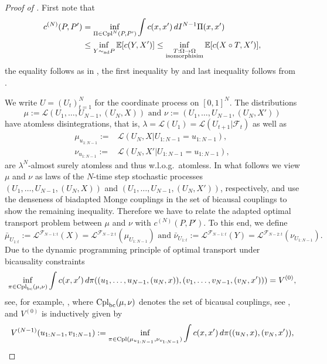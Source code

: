 \documentclass[a4paper]{amsart}
\numberwithin{theorem}{section}
\theoremstyle{definition}
\newcommand{\E}{\mathbb{E}}
\newcommand{\F}{\mathcal{F}}
\newcommand{\law}{\mathcal{L}}
\newcommand{\cpl}{\textup{Cpl}}
\newcommand{\simad}{\sim_{\mathrm{ad}}}
\begin{document}
\begin{proof}[Proof of ]
    First note that
    \begin{align*}
        c^{(N)}(P,P') &= \inf_{\Pi \in \cpl^N(P,P')} \int c(x,x') \, dI^{N-1} \Pi(x,x') \\
        &\le \inf_{Y \simad P} \E[c(Y,X')] \le \inf_{ \substack{ T : \Omega \to \Omega \\ {\rm isomorphisim} } } \E[c(X \circ T, X')],        
    \end{align*}
    the equality follows as in , the first inequality by  and last inequality follows from .
    
 
    We write $U=(U_t)_{t=1}^N$ for the coordinate process on $[0,1]^N$. The distributions
    \[
        \mu := \law(U_1,\dots,U_{N-1},(U_N,X)) \text{ and }
        \nu := (U_1,\dots,U_{N-1},(U_N,X'))
    \]
    have atomless disintegrations, that is, $\lambda = \law(U_1) = \law(U_{t + 1} | \F_t)$ as well as 
    \begin{align*}
        \mu_{u_{1:N-1}} :=& \law(U_N,X|U_{1:N-1} = u_{1:N-1}),\\
        \nu_{u_{1:N-1}} :=& \law(U_N,X'|U_{1:N-1} = u_{1:N-1}),
    \end{align*}
    are $\lambda^N$-almost surely atomless and thus w.l.o.g.\  atomless. 
    In what follows we view $\mu$ and $\nu$ as laws of the $N$-time step stochastic processes $(U_1,\dots,U_{N-1},(U_N,X))$ and $(U_1,\dots,U_{N-1},(U_N,X'))$, respectively, and use the denseness of biadapted Monge couplings in the set of bicausal couplings to show the remaining inequality.
    Therefore we have to relate the adapted optimal transport problem between $\mu$ and $\nu$ with $c^{(N)}(P,P')$.
    To this end, we define
    \[
        \bar\mu_{U_{1:t}} := \law^{\F_{N-1:t}}(X) = \law^{\F_{N-2:t}}(\mu_{U_{1:N-1}}) \text{ and }
        \bar \nu_{U_{1:t}} := \law^{\F_{N-1:t}}(Y)= \law^{\F_{N-2:t}}(\nu_{U_{1:N-1}}).
    \]
    Due to the dynamic programming principle of optimal transport under bicausality constraints
    \[
        \inf_{\pi \in \cpl_{\rm bc}(\mu,\nu)} \int c(x,x') \, d\pi((u_1,\dots,u_{N-1},(u_N,x)),(v_1,\dots,v_{N-1},(v_N,x'))) = V^{(0)},
    \]
    see, for example, \cite[Theorem 3.2]{AcKrPa24}, where $\cpl_{\rm bc}(\mu,\nu)$ denotes the set of bicausal couplings, see \cite[Definition 2.4]{AcKrPa24}, and $V^{(0)}$ is inductively given by
    \begin{gather*}
        V^{(N-1)}(u_{1:N-1},v_{1:N-1}) := \inf_{\pi \in \cpl(\mu_{u_{1:N-1}},\nu_{v_{1:N-1}})} \int c(x,x') \, d\pi((u_N,x),(v_N,x')), 

\end{gather*}
\end{proof}
\end{document}
